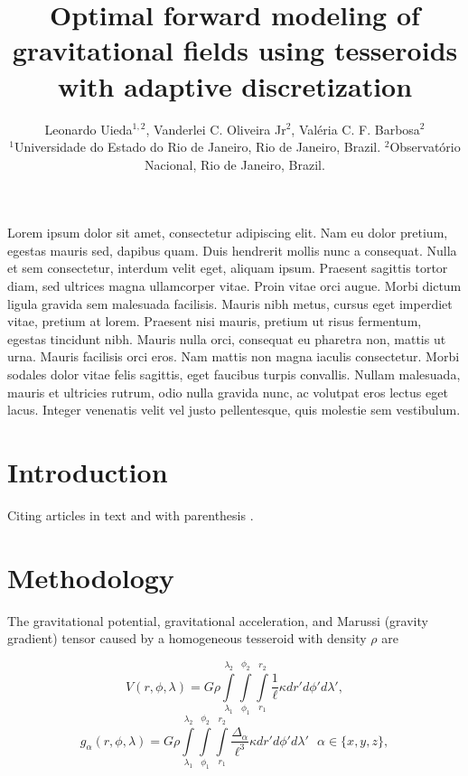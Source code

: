 \documentclass[extra]{gji}
\title[Optimal forward modeling using tesseroids]{
    Optimal forward modeling of gravitational fields
    using tesseroids with adaptive discretization
}
\author[Uieda et al.]{
    Leonardo Uieda$^{1,2}$,
    Vanderlei C. Oliveira Jr$^2$,
    Val\'eria C. F. Barbosa$^2$
    \\
    $^1$Universidade do Estado do Rio de Janeiro, Rio de Janeiro, Brazil.
    $^2$Observat\'orio Nacional, Rio de Janeiro, Brazil.
}
\begin{document}
\label{firstpage}
\maketitle


\begin{summary}
Lorem ipsum dolor sit amet, consectetur adipiscing elit. Nam eu dolor pretium,
egestas mauris sed, dapibus quam. Duis hendrerit mollis nunc a consequat. Nulla
et sem consectetur, interdum velit eget, aliquam ipsum. Praesent sagittis
tortor diam, sed ultrices magna ullamcorper vitae. Proin vitae orci augue.
Morbi dictum ligula gravida sem malesuada facilisis. Mauris nibh metus, cursus
eget imperdiet vitae, pretium at lorem. Praesent nisi mauris, pretium ut risus
fermentum, egestas tincidunt nibh. Mauris nulla orci, consequat eu pharetra
non, mattis ut urna. Mauris facilisis orci eros. Nam mattis non magna iaculis
consectetur. Morbi sodales dolor vitae felis sagittis, eget faucibus turpis
convallis. Nullam malesuada, mauris et ultricies rutrum, odio nulla gravida
nunc, ac volutpat eros lectus eget lacus. Integer venenatis velit vel justo
pellentesque, quis molestie sem vestibulum.
\end{summary}

\section{Introduction}

Citing articles in text \citet{Asgharzadeh2007} and with parenthesis
\citep{Braitenberg2011}.


\section{Methodology}

The gravitational potential,
gravitational acceleration,
and Marussi (gravity gradient) tensor
caused by a homogeneous tesseroid
with density $\rho$
are \citep{Grombein2013}

\begin{equation}
    V(r,\phi,\lambda) = G \rho
        \int\limits_{\lambda_1}^{\lambda_2}
        \int\limits_{\phi_1}^{\phi_2}
        \int\limits_{r_1}^{r_2}
        \frac{1}{\ell} \kappa  dr' d\phi' d\lambda',
    \label{eq:tesspot}
\end{equation}
\begin{equation}
    g_{\alpha}(r,\phi,\lambda) = G \rho
        \int\limits_{\lambda_1}^{\lambda_2}
        \int\limits_{\phi_1}^{\phi_2}
        \int\limits_{r_1}^{r_2}
        \frac{\Delta_{\alpha}}{\ell^3} \kappa dr' d\phi' d\lambda'
        \ \ \ \alpha \in \{x,y,z\},
    \label{eq:tessgrav}
\end{equation}
\end{document}
